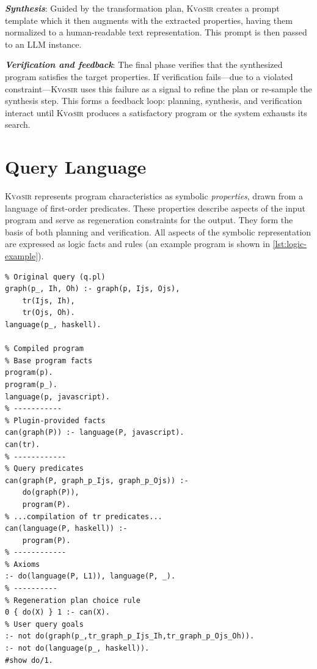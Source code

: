 \documentclass[nonacm,sigplan,review]{acmart}
\def\eg{{\em e.g.}, }
\newcommand{\sys}{{\scshape Kv{$\alpha$}sir}\xspace}
\newcommand{\heading}[1]{\vspace{2pt}\noindent\textbf{\emph{#1}}:\enspace}
\newcommand{\ttt}[1]{\texttt{#1}\xspace}
\begin{document}
\heading{Synthesis}
Guided by the transformation plan, \sys creates a prompt template which it then
augments with the extracted properties, having them normalized to a human-readable text representation.
This prompt is then passed to an LLM instance.

\heading{Verification and feedback}
The final phase verifies that the
synthesized program satisfies the target properties.
If verification fails---due to a violated constraint---\sys uses this
failure as a signal to refine the plan or re-sample the synthesis step.
This forms a feedback loop: planning, synthesis, and verification interact until \sys
produces a satisfactory program or the system exhausts its search.

\section{Query Language}
\label{sec:dsl}

\sys represents program characteristics as symbolic \emph{properties}, drawn from a language of first-order predicates.
These properties describe aspects of the input program and serve as regeneration constraints for the output.
They form the basis of both planning and verification.
All aspects of the symbolic representation are expressed as logic facts and rules (an example program is shown in \cref{lst:logic-example}).

\begin{listing}[t]
  \begin{verbatim}
% Original query (q.pl)
graph(p_, Ih, Oh) :- graph(p, Ijs, Ojs),
    tr(Ijs, Ih),
    tr(Ojs, Oh).
language(p_, haskell).

% Compiled program
% Base program facts
program(p).
program(p_).
language(p, javascript).
% -----------
% Plugin-provided facts
can(graph(P)) :- language(P, javascript).
can(tr).
% ------------
% Query predicates
can(graph(P, graph_p_Ijs, graph_p_Ojs)) :-
    do(graph(P)),
    program(P).
% ...compilation of tr predicates...
can(language(P, haskell)) :-
    program(P).
% ------------
% Axioms
:- do(language(P, L1)), language(P, _). 
% ----------
% Regeneration plan choice rule
0 { do(X) } 1 :- can(X).
% User query goals
:- not do(graph(p_,tr_graph_p_Ijs_Ih,tr_graph_p_Ojs_Oh)).
:- not do(language(p_, haskell)).
#show do/1.
\end{verbatim}
  \caption{\textbf{Compiled \sys logic program.}
  The logic program that produces the plan for the idiomatization task in \cref{sec:example}. 
  The program contains facts coming from 
  (1) the input program (written in C),
  (2) three plugins (\ttt{len}, \ttt{fsignt}, and \ttt{tr}),
  (3) axioms from the logic engine (\eg a program can have one language, an analysis will be applied only if possible, all goals must be satisfied), and
  (4) the user query (the user wants to minimize the program's length).
  }
  \label{lst:logic-example}
\end{listing}
\end{document}
